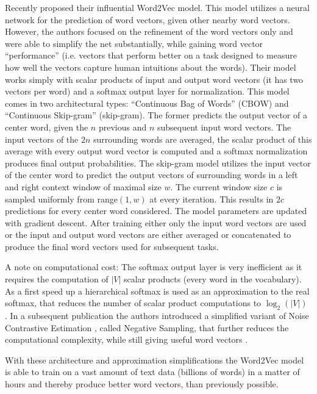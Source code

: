 Recently \citet{Mikolov2013a} proposed their influential Word2Vec model.
This model utilizes a neural network for the prediction of word vectors,
given other nearby word vectors. However, the authors focused on the
refinement of the word vectors only and were able to simplify the
net substantially, while gaining word vector ``performance'' (i.e.
vectors that perform better on a task designed to measure how well
the vectors capture human intuitions about the words). Their model
works simply with scalar products of input and output word vectors
(it has two vectors per word) and a softmax output layer for normalization.
This model comes in two architectural types: ``Continuous Bag of Words''
(CBOW) and ``Continuous Skip-gram'' (skip-gram). The former predicts
the output vector of a center word, given the $n$ previous and
$n$ subsequent input word vectors. The input vectors of the $2n$
surrounding words are averaged, the scalar product of this average
with every output word vector is computed and a softmax normalization
produces final output probabilities. The skip-gram model utilizes
the input vector of the center word to predict the output vectors
of surrounding words in a left and right context window of maximal
size $w$. The current window size $c$ is sampled uniformly from
range$(1,w)$ at every iteration. This results in $2c$ predictions
for every center word considered. The model parameters are updated
with gradient descent. After training either only the input word vectors
are used or the input and output word vectors are either averaged
or concatenated to produce the final word vectors used for subsequent
tasks. 

A note on computational cost: The softmax output layer is very inefficient
as it requires the computation of $|V|$ scalar products (every word
in the vocabulary). As a first speed up a hierarchical softmax \citep{Morin2005} is
used as an approximation to the real softmax, that reduces the number
of scalar product computations to $\log_{2}(|V|)$ \citep{Mikolov2013a}.
In a subsequent publication the authors introduced a
simplified variant of Noise Contrastive Estimation \citep{Gutmann2012}, called
Negative Sampling, that further reduces the computational complexity,
while still giving useful word vectors \citep{Mikolov2013b}. 

With these architecture and approximation simplifications the Word2Vec
model is able to train on a vast amount of text data (billions of
words) in a matter of hours and thereby produce better word vectors,
than previously possible.


